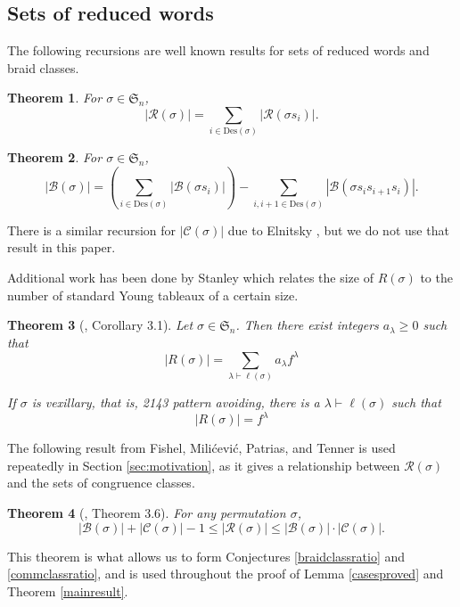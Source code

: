 \documentclass[11pt,reqno]{amsart}
\newtheorem{theorem}{Theorem}[section]
\theoremstyle{definition}
\theoremstyle{notation}
\newcommand{\Des}{\text{Des}}
\newcommand{\calR}{\mathcal{R}}
\newcommand{\calB}{\mathcal{B}}
\newcommand{\calC}{\mathcal{C}}
\begin{document}
\subsection{Sets of reduced words} The following recursions are well known results for sets of reduced words and braid classes. 

\begin{theorem}\label{redrec}
For $\sigma\in \mathfrak{S}_n$, 
\[
|\calR(\sigma)| = \sum_{i\in \Des(\sigma)} |\calR(\sigma s_i)|. %
\]
\end{theorem}


\begin{theorem}\label{Braidrec}
For $\sigma \in \mathfrak{S}_n$,
\[
|\calB(\sigma)| =\left ( \sum_{i\in \Des(\sigma)}|\calB(\sigma s_i)| \right )-  \sum_{i, i+1 \in \Des(\sigma)} |\calB(\sigma s_is_{i+1}s_i)|.
\]
\end{theorem}

There is a similar recursion for $|\calC(\sigma)|$ due to Elnitsky \cite{E}, but we do not use that result in this paper.

Additional work has been done by Stanley \cite{S1} which relates the size of $R(\sigma)$ to the number of standard Young tableaux of a certain size. 

\begin{theorem}[\cite{S1}, Corollary 3.1]\label{vexTab}
Let $\sigma \in \mathfrak{S}_n$. Then there exist integers $a_\lambda \geq 0$ such that 
\[
|R(\sigma )| = \sum_{\lambda \vdash \ell(\sigma)} a_\lambda f^\lambda
\]

If $\sigma$ is \emph{vexillary}, that is, 2143 pattern avoiding, there is a $\lambda \vdash \ell(\sigma)$ such that 
\[
|R(\sigma)| = f^\lambda
\]
\end{theorem}

The following result from Fishel, Milićević, Patrias, and Tenner is used repeatedly in Section \ref{sec:motivation}, as it gives a relationship between $\calR(\sigma)$ and the sets of congruence classes.

\begin{theorem}[\cite{F}, Theorem 3.6]\label{bound1}
For any permutation $\sigma$,
\[
|\calB(\sigma)|+|\calC(\sigma)|-1\leq |\calR(\sigma)|\leq |\calB(\sigma)|\cdot |\calC(\sigma)|.
\]
\end{theorem}

This theorem is what allows us to form Conjectures \ref{braidclassratio} and \ref{commclassratio}, and is used throughout the proof of Lemma \ref{casesproved} and Theorem \ref{mainresult}.
\end{document}
